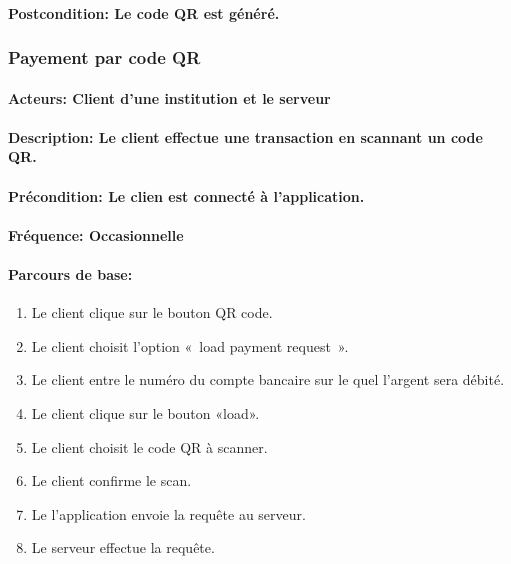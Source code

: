 \documentclass[../annexe.tex]{subfiles}
\begin{document}
        \paragraph{Postcondition: Le code QR est généré. }

\newpage    


    \subsubsection{Payement par code QR }

        \paragraph{Acteurs: Client d’une institution et le serveur}
        \paragraph{Description: Le client effectue une transaction en scannant un code QR.}
        \paragraph{Précondition: Le clien est connecté à l’application.}
        \paragraph{Fréquence: Occasionnelle}
        \paragraph{Parcours de base:}
        \begin{enumerate}
            \item  Le client clique sur le bouton QR code.
            \item  Le client choisit l’option « load payment request ».
            \item  Le client entre le numéro du compte bancaire sur le quel l’argent sera débité.
            \item  Le client clique sur le bouton «load».
            \item  Le client choisit le code QR à scanner.
            \item  Le client confirme le scan.
            \item  Le l’application envoie la requête au serveur.
            \item  Le serveur effectue la requête. 
        \end{enumerate}
\end{document}
